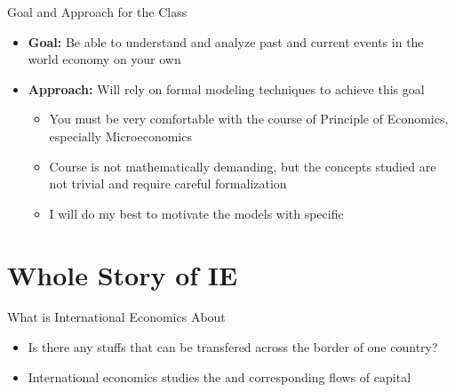 \documentclass[10pt,hyperref={CJKbookmarks=true},xcolor=dvipsnames,aspectratio=43]{beamer}
\begin{document}
\begin{frame}{Goal and Approach for the Class}

\begin{itemize}
\item \textbf{Goal:} Be able to understand and analyze past and current
events in the world economy on your own
\item \textbf{Approach:} Will rely on formal modeling techniques to achieve
this goal
\begin{itemize}
\item You must be very comfortable with the course of Principle of Economics,
especially Microeconomics
\item Course is not mathematically demanding, but the concepts studied are
not trivial and require careful formalization 
\item I will do my best to motivate the models with specific 
\end{itemize}
\end{itemize}
\end{frame}

\section{Whole Story of IE}%
\begin{frame}{What is International Economics About}

\begin{itemize}
\item Is there any stuffs that can be transfered across the border of one country?
\item International economics studies the  and corresponding flows of capital   

\end{itemize}

\end{frame}
\end{document}
